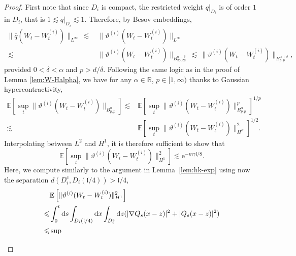 \documentclass[11pt, a4paper]{scrartcl}
\numberwithin{equation}{section}
\theoremstyle{plain}
\theoremstyle{remark}
\newcommand{\mathd}{\mathrm{d}}
\newcommand{\mathe}{\mathrm{e}}
\newcommand{\tmscript}[1]{\text{\scriptsize{$#1$}}}
\begin{document}
\begin{proof}
	First note that since $D_i$ is compact, the restricted weight $q|_{D_i}$ is
	of order $1$ in $D_i$, that is $1 \lesssim q|_{D_i} \lesssim 1$. Therefore,
	by Besov embeddings,
	\begin{equation*}
		\begin{aligned}
			\| \bar{q} (W_t - W_t^{(i)}) \|_{L^{\infty}}
			\,\lesssim\, & \| \vartheta^{(i)} (W_t -
			W_t^{(i)}) \|_{L^{\infty}}                          \\
			\,\lesssim\, & \| \vartheta^{(i)} (W_t - W_t^{(i)})
			\|_{B^{\alpha - \delta}_{\infty, \infty}}
			\,\lesssim\,  \| \vartheta^{(i)} (W_t -
			W_t^{(i)}) \|_{B_{p, p}^{\alpha + \delta}},
		\end{aligned}
	\end{equation*}
	provided $0 < \delta < \alpha$ and $p > d / \delta$. Following the same
	logic as in the proof of Lemma \ref{lem:W-Halpha}, we have for any $\alpha
		\in \mathbb{R}$, $p \in [1, \infty)$ thanks to Gaussian hypercontractivity,
	\begin{equation*}
		\begin{aligned}
			\mathbb{E} [\sup_t \| \vartheta^{(i)} (W_t - W_t^{(i)}) \|_{B_{p, p}^{\alpha}}]
			\lesssim & \mathbb{E} [\sup_t \| \vartheta^{(i)} (W_t - W_t^{(i)}) \|_{B_{p,
			p}^{\alpha}}^p]^{1 / p}                                                      \\
			\lesssim & \mathbb{E} [\sup_t \| \vartheta^{(i)} (W_t -
				W_t^{(i)}) \|_{H^{\alpha}}^2]^{1 / 2} .
		\end{aligned}
	\end{equation*}
	Interpolating between $L^2$ and $H^1$, it is therefore sufficient to show
	that
	\[ \mathbb{E} \left[\sup_t \| \vartheta^{(i)} (W_t - W_t^{(i)}) \|^2_{H^1}\right] \lesssim
		\mathe^{- m \gamma \mathfrak{l}/ 8} . \]
	Here, we compute similarly to the argument in Lemma~\ref{lem:hk-exp} using
	now the separation $d (D_i^c, D_i (\mathfrak{l}/ 4)) >\mathfrak{l}/ 4$,
	\begin{align*}
		          & \mathbb{E} \left[\| \vartheta^{(i)} (W_t - W_t^{(i)})
		\|_{{H^1}}^2\right]                                                                                \\
		\leqslant & \int_0^t \mathd s \int_{D_i (\mathfrak{l}/ 4)} \mathd x
		\int_{D_i^c} \mathd z (| \nabla Q_s (x - z) |^2 + | Q_s (x - z) |^2)                               \\
		\leqslant & \sup_{\tmscript{\begin{array}{l}

\end{array}}}
\end{align*}
\end{proof}
\end{document}
